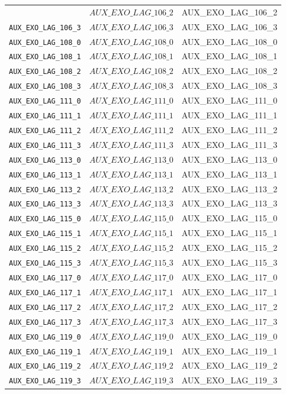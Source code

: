 \begin{center}
\begin{longtable}{ccc}
{\texttt{AUX\_EXO\_LAG\_106\_2} & $AUX\_EXO\_LAG\_106\_2$ & AUX\_EXO\_LAG\_106\_2\\
\texttt{AUX\_EXO\_LAG\_106\_3} & $AUX\_EXO\_LAG\_106\_3$ & AUX\_EXO\_LAG\_106\_3\\
\texttt{AUX\_EXO\_LAG\_108\_0} & $AUX\_EXO\_LAG\_108\_0$ & AUX\_EXO\_LAG\_108\_0\\
\texttt{AUX\_EXO\_LAG\_108\_1} & $AUX\_EXO\_LAG\_108\_1$ & AUX\_EXO\_LAG\_108\_1\\
\texttt{AUX\_EXO\_LAG\_108\_2} & $AUX\_EXO\_LAG\_108\_2$ & AUX\_EXO\_LAG\_108\_2\\
\texttt{AUX\_EXO\_LAG\_108\_3} & $AUX\_EXO\_LAG\_108\_3$ & AUX\_EXO\_LAG\_108\_3\\
\texttt{AUX\_EXO\_LAG\_111\_0} & $AUX\_EXO\_LAG\_111\_0$ & AUX\_EXO\_LAG\_111\_0\\
\texttt{AUX\_EXO\_LAG\_111\_1} & $AUX\_EXO\_LAG\_111\_1$ & AUX\_EXO\_LAG\_111\_1\\
\texttt{AUX\_EXO\_LAG\_111\_2} & $AUX\_EXO\_LAG\_111\_2$ & AUX\_EXO\_LAG\_111\_2\\
\texttt{AUX\_EXO\_LAG\_111\_3} & $AUX\_EXO\_LAG\_111\_3$ & AUX\_EXO\_LAG\_111\_3\\
\texttt{AUX\_EXO\_LAG\_113\_0} & $AUX\_EXO\_LAG\_113\_0$ & AUX\_EXO\_LAG\_113\_0\\
\texttt{AUX\_EXO\_LAG\_113\_1} & $AUX\_EXO\_LAG\_113\_1$ & AUX\_EXO\_LAG\_113\_1\\
\texttt{AUX\_EXO\_LAG\_113\_2} & $AUX\_EXO\_LAG\_113\_2$ & AUX\_EXO\_LAG\_113\_2\\
\texttt{AUX\_EXO\_LAG\_113\_3} & $AUX\_EXO\_LAG\_113\_3$ & AUX\_EXO\_LAG\_113\_3\\
\texttt{AUX\_EXO\_LAG\_115\_0} & $AUX\_EXO\_LAG\_115\_0$ & AUX\_EXO\_LAG\_115\_0\\
\texttt{AUX\_EXO\_LAG\_115\_1} & $AUX\_EXO\_LAG\_115\_1$ & AUX\_EXO\_LAG\_115\_1\\
\texttt{AUX\_EXO\_LAG\_115\_2} & $AUX\_EXO\_LAG\_115\_2$ & AUX\_EXO\_LAG\_115\_2\\
\texttt{AUX\_EXO\_LAG\_115\_3} & $AUX\_EXO\_LAG\_115\_3$ & AUX\_EXO\_LAG\_115\_3\\
\texttt{AUX\_EXO\_LAG\_117\_0} & $AUX\_EXO\_LAG\_117\_0$ & AUX\_EXO\_LAG\_117\_0\\
\texttt{AUX\_EXO\_LAG\_117\_1} & $AUX\_EXO\_LAG\_117\_1$ & AUX\_EXO\_LAG\_117\_1\\
\texttt{AUX\_EXO\_LAG\_117\_2} & $AUX\_EXO\_LAG\_117\_2$ & AUX\_EXO\_LAG\_117\_2\\
\texttt{AUX\_EXO\_LAG\_117\_3} & $AUX\_EXO\_LAG\_117\_3$ & AUX\_EXO\_LAG\_117\_3\\
\texttt{AUX\_EXO\_LAG\_119\_0} & $AUX\_EXO\_LAG\_119\_0$ & AUX\_EXO\_LAG\_119\_0\\
\texttt{AUX\_EXO\_LAG\_119\_1} & $AUX\_EXO\_LAG\_119\_1$ & AUX\_EXO\_LAG\_119\_1\\
\texttt{AUX\_EXO\_LAG\_119\_2} & $AUX\_EXO\_LAG\_119\_2$ & AUX\_EXO\_LAG\_119\_2\\
\texttt{AUX\_EXO\_LAG\_119\_3} & $AUX\_EXO\_LAG\_119\_3$ & AUX\_EXO\_LAG\_119\_3\\
\hline%
\end{longtable}
\end{center}
